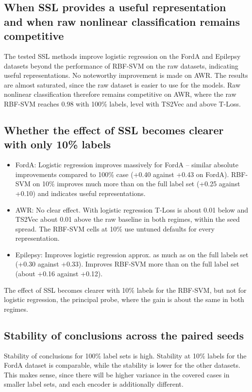 \documentclass[a4paper,11pt]{article}
\begin{document}
\subsection{When SSL provides a useful representation and when raw nonlinear classification remains competitive}
The tested SSL methods improve logistic regression on the FordA and Epilepsy datasets beyond the performance of RBF-SVM on the raw datasets, indicating useful representations. No noteworthy improvement is made on AWR. The results are almost saturated, since the raw dataset is easier to use for the models. Raw nonlinear classification therefore remains competitive on AWR, where the raw RBF-SVM reaches 0.98 with 100\% labels, level with TS2Vec and above T-Loss.

\subsection{Whether the effect of SSL becomes clearer with only 10\% labels}
\begin{itemize}
\item FordA: Logistic regression improves massively for FordA -- similar absolute improvements compared to 100\% case (+0.40 against +0.43 on FordA). RBF-SVM on 10\% improves much more than on the full label set (+0.25 against +0.10) and indicates useful representations.
\item AWR: No clear effect. With logistic regression T-Loss is about 0.01 below and TS2Vec about 0.01 above the raw baseline in both regimes, within the seed spread. The RBF-SVM cells at 10\% use untuned defaults for every representation.
\item Epilepsy: Improves logistic regression approx. as much as on the full labels set (+0.30 against +0.33). Improves RBF-SVM more than on the full label set (about +0.16 against +0.12).
\end{itemize}

The effect of SSL becomes clearer with 10\% labels for the RBF-SVM, but not for logistic regression, the principal probe, where the gain is about the same in both regimes.

\subsection{Stability of conclusions across the paired seeds}
Stability of conclusions for 100\% label sets is high. Stability at 10\% labels for the FordA dataset is comparable, while the stability is lower for the other datasets. This makes sense, since there will be higher variance in the covered cases in smaller label sets, and each encoder is additionally different.
\end{document}
